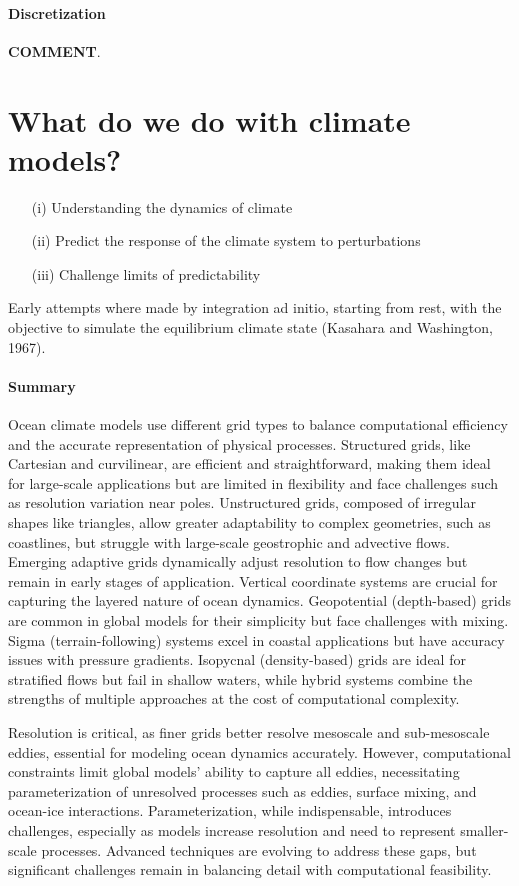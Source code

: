 \paragraph{Discretization} \textbf{COMMENT}.



\section{What do we do with climate models?}
\begin{enumerate}
	\item[(i)] Understanding the dynamics of climate
	\item[(ii)] Predict the response of the climate system to perturbations
	\item[(iii)] Challenge limits of predictability
\end{enumerate}
Early attempts where made by integration ad initio, starting from rest, with the objective to simulate the equilibrium climate state (Kasahara and Washington, 1967).
\paragraph{Summary}
Ocean climate models use different grid types to balance computational efficiency and the accurate representation of physical processes. Structured grids, like Cartesian and curvilinear, are efficient and straightforward, making them ideal for large-scale applications but are limited in flexibility and face challenges such as resolution variation near poles. Unstructured grids, composed of irregular shapes like triangles, allow greater adaptability to complex geometries, such as coastlines, but struggle with large-scale geostrophic and advective flows. Emerging adaptive grids dynamically adjust resolution to flow changes but remain in early stages of application. Vertical coordinate systems are crucial for capturing the layered nature of ocean dynamics. Geopotential (depth-based) grids are common in global models for their simplicity but face challenges with mixing. Sigma (terrain-following) systems excel in coastal applications but have accuracy issues with pressure gradients. Isopycnal (density-based) grids are ideal for stratified flows but fail in shallow waters, while hybrid systems combine the strengths of multiple approaches at the cost of computational complexity.

Resolution is critical, as finer grids better resolve mesoscale and sub-mesoscale eddies, essential for modeling ocean dynamics accurately. However, computational constraints limit global models' ability to capture all eddies, necessitating parameterization of unresolved processes such as eddies, surface mixing, and ocean-ice interactions. Parameterization, while indispensable, introduces challenges, especially as models increase resolution and need to represent smaller-scale processes. Advanced techniques are evolving to address these gaps, but significant challenges remain in balancing detail with computational feasibility.


